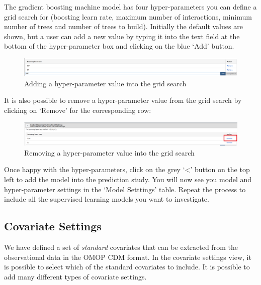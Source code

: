\documentclass[11pt]{book}
\begin{document}
The gradient boosting machine model has four hyper-parameters you can
define a grid search for (boosting learn rate, maximum number of
interactions, minimum number of trees and number of trees to build).
Initially the default values are shown, but a user can add a new value
by typing it into the text field at the bottom of the hyper-parameter
box and clicking on the blue `Add' button.\\

\begin{figure}
\includegraphics[width=1\linewidth]{images/PatientLevelPrediction/atlasImplementation/analysis_adding_hyper} \caption{Adding a hyper-parameter value into the grid search}\label{fig:figureAS6}
\end{figure}

It is also possible to remove a hyper-parameter value from the grid
search by clicking on `Remove' for the corresponding row:

\begin{figure}
\includegraphics[width=1\linewidth]{images/PatientLevelPrediction/atlasImplementation/analysis_removing_hyper} \caption{Removing a hyper-parameter value into the grid search}\label{fig:figureAS7}
\end{figure}

Once happy with the hyper-parameters, click on the grey `\textless{}'
button on the top left to add the model into the prediction study. You
will now see you model and hyper-parameter settings in the `Model
Setttings' table. Repeat the process to include all the supervised
learning models you want to investigate.

\subsection{Covariate Settings}\label{covariate-settings}

We have defined a set of \emph{standard} covariates that can be
extracted from the observational data in the OMOP CDM format. In the
covariate settings view, it is possible to select which of the standard
covariates to include. It is possible to add many different types of
covariate settings.
\end{document}
